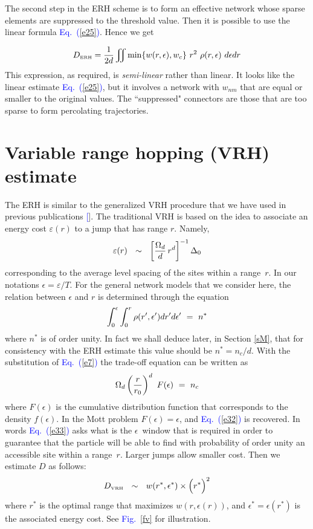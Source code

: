 \documentclass[aps,prb,floats,floatfix,twocolumn]{revtex4}
\newcommand{\tbox}[1]{\mbox{\tiny #1}}
\newcommand{\mylabel}[1]{\label{#1}}
\newcommand{\eeq}{\end{eqnarray}}
\newcommand{\be}[1]{\begin{eqnarray}\ifthenelse{#1=-1}
{\nonumber}{\ifthenelse{#1=0}{}{\mylabel{e#1}}}}
\newcommand{\Eq}[1]{\textcolor{blue}{Eq.\!\!~(\ref{#1})}}
\newcommand{\Fig}[1]{\textcolor{blue}{Fig.}\!\!~\ref{#1}}
\renewcommand{\cite}[1]{\textcolor{blue}{[\onlinecite{#1}}]} %
\begin{document}
The second step in the ERH scheme is to form an effective 
network whose sparse elements are suppressed to the threshold value.  
Then it is possible to use the linear formula \Eq{e25}. Hence we get 

%
\be{31}
D_{\tbox{ERH}} = \frac{1}{2d}\iint \min\{w(r,\epsilon),w_c\} \ r^2  \ \rho(r,\epsilon) \ d\epsilon dr
\eeq
%
This expression, as required, is {\em semi-linear} rather than linear. 
It looks like the linear estimate \Eq{e25}, but it involves a network 
with $w_{nm}$ that are equal or smaller to the original values.
The ``suppressed" connectors are those that are too sparse 
to form percolating trajectories. 


\section{Variable range hopping (VRH) estimate}

The ERH is similar to the generalized VRH procedure 
that we have used in previous publications \cite{kbd,kbw}.
The traditional VRH is based on the idea to associate
an energy cost $\varepsilon(r)$ to a jump that has range $r$. Namely,  
%
\be{32}
\varepsilon(r) \ \ \sim \ \ \left[\frac{\Omega_d}{d}\, r^d\right]^{-1} \Delta_0
\eeq
%  
corresponding to the average level spacing 
of the sites within a range~$r$. 
%
In our notations $\epsilon=\varepsilon/T$.  
For the general network models that we consider here,
the relation between $\epsilon$ and $r$ 
is determined through the equation 
%
\be{33}
\int_0^{\epsilon} \int_0^{r} \rho(r',\epsilon')  dr'd\epsilon' \  = \  n^* 
\eeq
%
where $n^*$ is of order unity. In fact we shall deduce later, 
in Section \ref{sM}, that for consistency with the ERH estimate 
this value should be $n^*=n_c/d$. With the substitution 
of \Eq{e7} the trade-off equation can be written as 
%
\be{34}
\Omega_d\left(\frac{r}{r_0}\right)^d \ F(\epsilon) \ = \ n_c
\eeq
%
where $F(\epsilon)$ is the cumulative distribution function 
that corresponds to the density $f(\epsilon)$.
In the Mott problem $F(\epsilon)=\epsilon$, and \Eq{e32} is recovered.
In words \Eq{e33} asks what is the $\epsilon$~window that 
is required in order to guarantee that the particle will be able 
to find with probability of order unity an accessible site within 
a range~$r$. Larger jumps allow smaller cost. 
Then we estimate $D$ as follows: 
%
\be{35}
D_{\tbox{VRH}}  \ \ \sim \ \ 
w(r^*,\epsilon^*) \times  \Big(r^*\Big)^2
\eeq
%
where $r^*$ is the optimal range that maximizes $w(r,\epsilon(r))$, 
and $\epsilon^*=\epsilon(r^*)$ is the associated energy cost. 
See \Fig{fv} for illustration.
\end{document}

